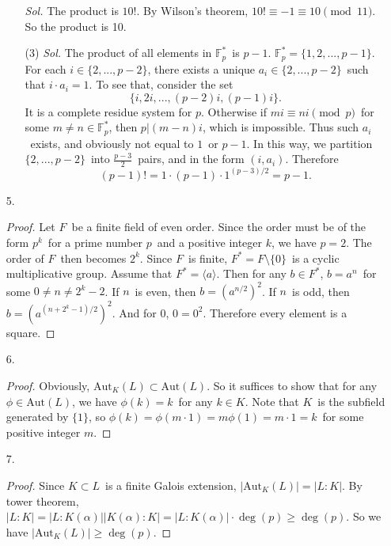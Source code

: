 \documentclass[12pt]{article}
\newcommand{\F}{\mathbb{F}}
\newcommand{\la}{\langle}
\newcommand{\ra}{\rangle}
\newcommand{\aut}{\text{Aut}}
\begin{document}
\begin{enumerate}
\begin{enumerate}
		\textit{Sol.}
			\quad The product is $10!$. By Wilson's theorem, $10!\equiv-1\equiv10\pmod{11}$. So the product is 10.
		\item[(3)]
		\textit{Sol.}
			\quad The product of all elements in $\F_p^*$\ is $p-1$. $\F_p^*=\{1,2,...,p-1\}$. For each $i\in\{2,...,p-2\}$, there exists a unique $a_i\in\{2,...,p-2\}$\ such that $i\cdot a_i=1$. To see that, consider the set
			$$\{i,2i,...,(p-2)i,(p-1)i\}.$$
			It is a complete residue system for $p$. Otherwise if $mi\equiv ni\pmod{p}$\ for some $m\neq n\in\F_p^*$, then $p|(m-n)i$, which is impossible. Thus such $a_i$\ exists, and obviously not equal to $1$\ or $p-1$. In this way, we partition $\{2,...,p-2\}$\ into $\frac{p-3}{2}$\ pairs, and in the form $(i,a_i)$. Therefore
			$$(p-1)!=1\cdot(p-1)\cdot1^{(p-3)/2}=p-1.$$
	\end{enumerate}
	\item[5.]
	\begin{proof}
		\quad Let $F$\ be a finite field of even order. Since the order must be of the form $p^k$\ for a prime number $p$\ and a positive integer $k$, we have $p=2$. The order of $F$\ then becomes $2^k$. Since $F$\ is finite, $F^*=F\setminus\{0\}$\ is a cyclic multiplicative group. Assume that $F^*=\la a\ra$. Then for any $b\in F^*$, $b=a^n$\ for some $0\neq n\neq2^k-2$. If $n$\ is even, then $b=(a^{n/2})^2$. If $n$\ is odd, then $b=(a^{(n+2^k-1)/2})^2$. And for $0$, $0=0^2$. Therefore every element is a square.
	\end{proof}
	\item[6.]
	\begin{proof}
		\quad Obviously, $\aut_K(L)\subset\aut(L)$. So it suffices to show that for any $\phi\in\aut(L)$, we have $\phi(k)=k$\ for any $k\in K$. Note that $K$\ is the subfield generated by $\{1\}$, so $\phi(k)=\phi(m\cdot1)=m\phi(1)=m\cdot1=k$\ for some positive integer $m$.
	\end{proof}
	\item[7.]
	\begin{proof}
		\quad Since $K\subset L$\ is a finite Galois extension, $|\aut_K(L)|=|L:K|$. By tower theorem, $|L:K|=|L:K(\alpha)||K(\alpha):K|=|L:K(\alpha)|\cdot\deg(p)\geq\deg(p)$. So we have $|\aut_K(L)|\geq\deg(p)$.
	\end{proof}
\end{enumerate}
\end{document}
